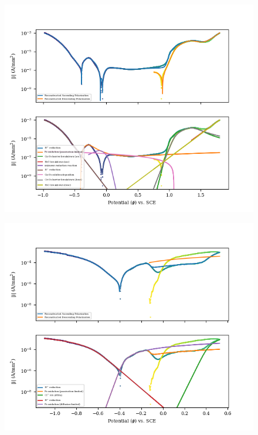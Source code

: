 \begin{figure}[h!]
	\centering
	\includegraphics[width=1.0\linewidth]{resources/fig_2a1.png}
\end{figure}

\begin{table}[h!]
	\centering
	
\end{table}

\begin{table}[h!]
	\centering
	
\end{table}

\begin{figure}[h!]
	\centering
	\includegraphics[width=1.0\linewidth]{resources/fig_2a2.png}
\end{figure}


